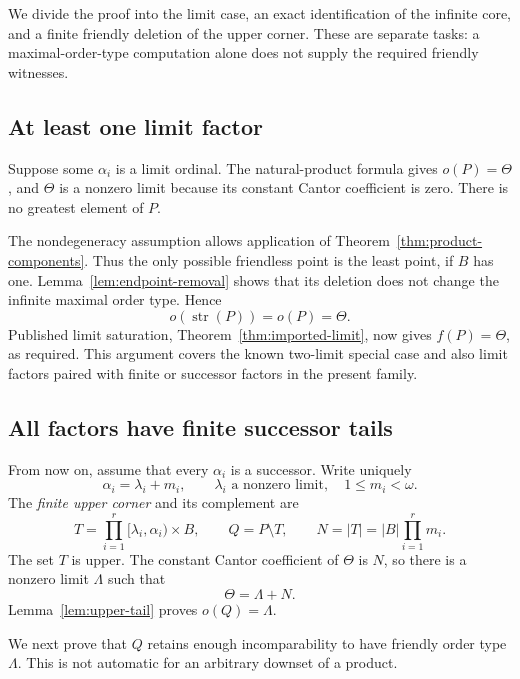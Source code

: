 \documentclass[11pt,letterpaper]{article}
\theoremstyle{definition}
\theoremstyle{remark}
\newcommand{\str}{\operatorname{str}}
\begin{document}
We divide the proof into the limit case, an exact identification of the
infinite core, and a finite friendly deletion of the upper corner. These
are separate tasks: a maximal-order-type computation alone does not
supply the required friendly witnesses.

\subsection{At least one limit factor}
Suppose some $\alpha_i$ is a limit ordinal. The natural-product formula
gives $o(P)=\Theta$, and $\Theta$ is a nonzero limit because its constant
Cantor coefficient is zero. There is no greatest element of $P$.

The nondegeneracy assumption allows application of
Theorem~\ref{thm:product-components}. Thus the only possible friendless
point is the least point, if $B$ has one. Lemma~\ref{lem:endpoint-removal}
shows that its deletion does not change the infinite maximal order type.
Hence
\[
 o(\str(P))=o(P)=\Theta.
\]
Published limit saturation, Theorem~\ref{thm:imported-limit}, now gives
$f(P)=\Theta$, as required. This argument covers the known two-limit
special case and also limit factors paired with finite or successor
factors in the present family.

\subsection{All factors have finite successor tails}
From now on, assume that every $\alpha_i$ is a successor. Write uniquely
\[
 \alpha_i=\lambda_i+m_i,
 \qquad \lambda_i\text{ a nonzero limit},\quad 1\le m_i<\omega.
\]
The \emph{finite upper corner} and its complement are
\begin{equation}\label{eq:corner}
 T=\prod_{i=1}^r[\lambda_i,\alpha_i)\times B,
 \qquad Q=P\setminus T,
 \qquad N=|T|=|B|\prod_{i=1}^r m_i.
\end{equation}
The set $T$ is upper. The constant Cantor coefficient of $\Theta$ is $N$,
so there is a nonzero limit $\Lambda$ such that
\begin{equation}\label{eq:theta-tail}
 \Theta=\Lambda+N.
\end{equation}
Lemma~\ref{lem:upper-tail} proves $o(Q)=\Lambda$.

We next prove that $Q$ retains enough incomparability to have friendly
order type $\Lambda$. This is not automatic for an arbitrary downset of a
product.
\end{document}
